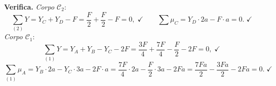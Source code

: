 \begin{esempio}
\begin{svolgimento}
		\noindent\textbf{Verifica.}
		\textit{Corpo $\mathcal{C}_2$}:
		\begin{equation*}
			\sum_{(2)} Y = Y_C + Y_D - F =
			\frac{F}{2} + \frac{F}{2} - F = 0,\;\checkmark
			\qquad
			\sum\mu_C = Y_D \cdot 2a - F \cdot a =
			0.\;\checkmark
		\end{equation*}
		\textit{Corpo $\mathcal{C}_1$}:
		\begin{equation*}
			\sum_{(1)}  Y= Y_A + Y_B - Y_C - 2F =
			\frac{3F}{4} + \frac{7F}{4} -
			\frac{F}{2} - 2F = 0,\;\checkmark
		\end{equation*}
		\begin{equation*}
			\sum_{(1)}\mu_A = Y_B \cdot 2a - Y_C \cdot 3a
			- 2F \cdot a =
			\frac{7F}{4} \cdot 2a -
			\frac{F}{2} \cdot 3a - 2Fa =
			\frac{7Fa}{2} - \frac{3Fa}{2} - 2Fa =
			0.\;\checkmark
		\end{equation*}
	\end{svolgimento}
\end{esempio}


